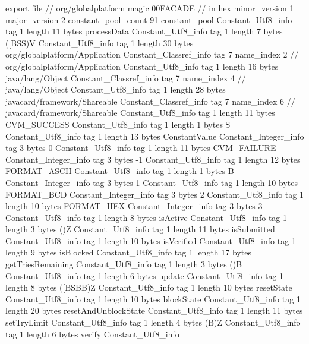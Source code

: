 export file {		// org/globalplatform
	magic	00FACADE		 // in hex
	minor_version	1
	major_version	2
	constant_pool_count	91
	constant_pool {
		Constant_Utf8_info {
			tag	1
			length	11
			bytes	processData
		}
		Constant_Utf8_info {
			tag	1
			length	7
			bytes	([BSS)V
		}
		Constant_Utf8_info {
			tag	1
			length	30
			bytes	org/globalplatform/Application
		}
		Constant_Classref_info {
			tag	7
			name_index	2		// org/globalplatform/Application
		}
		Constant_Utf8_info {
			tag	1
			length	16
			bytes	java/lang/Object
		}
		Constant_Classref_info {
			tag	7
			name_index	4		// java/lang/Object
		}
		Constant_Utf8_info {
			tag	1
			length	28
			bytes	javacard/framework/Shareable
		}
		Constant_Classref_info {
			tag	7
			name_index	6		// javacard/framework/Shareable
		}
		Constant_Utf8_info {
			tag	1
			length	11
			bytes	CVM_SUCCESS
		}
		Constant_Utf8_info {
			tag	1
			length	1
			bytes	S
		}
		Constant_Utf8_info {
			tag	1
			length	13
			bytes	ConstantValue
		}
		Constant_Integer_info {
			tag	3
			bytes	0
		}
		Constant_Utf8_info {
			tag	1
			length	11
			bytes	CVM_FAILURE
		}
		Constant_Integer_info {
			tag	3
			bytes	-1
		}
		Constant_Utf8_info {
			tag	1
			length	12
			bytes	FORMAT_ASCII
		}
		Constant_Utf8_info {
			tag	1
			length	1
			bytes	B
		}
		Constant_Integer_info {
			tag	3
			bytes	1
		}
		Constant_Utf8_info {
			tag	1
			length	10
			bytes	FORMAT_BCD
		}
		Constant_Integer_info {
			tag	3
			bytes	2
		}
		Constant_Utf8_info {
			tag	1
			length	10
			bytes	FORMAT_HEX
		}
		Constant_Integer_info {
			tag	3
			bytes	3
		}
		Constant_Utf8_info {
			tag	1
			length	8
			bytes	isActive
		}
		Constant_Utf8_info {
			tag	1
			length	3
			bytes	()Z
		}
		Constant_Utf8_info {
			tag	1
			length	11
			bytes	isSubmitted
		}
		Constant_Utf8_info {
			tag	1
			length	10
			bytes	isVerified
		}
		Constant_Utf8_info {
			tag	1
			length	9
			bytes	isBlocked
		}
		Constant_Utf8_info {
			tag	1
			length	17
			bytes	getTriesRemaining
		}
		Constant_Utf8_info {
			tag	1
			length	3
			bytes	()B
		}
		Constant_Utf8_info {
			tag	1
			length	6
			bytes	update
		}
		Constant_Utf8_info {
			tag	1
			length	8
			bytes	([BSBB)Z
		}
		Constant_Utf8_info {
			tag	1
			length	10
			bytes	resetState
		}
		Constant_Utf8_info {
			tag	1
			length	10
			bytes	blockState
		}
		Constant_Utf8_info {
			tag	1
			length	20
			bytes	resetAndUnblockState
		}
		Constant_Utf8_info {
			tag	1
			length	11
			bytes	setTryLimit
		}
		Constant_Utf8_info {
			tag	1
			length	4
			bytes	(B)Z
		}
		Constant_Utf8_info {
			tag	1
			length	6
			bytes	verify
		}
		Constant_Utf8_info {
}}}
